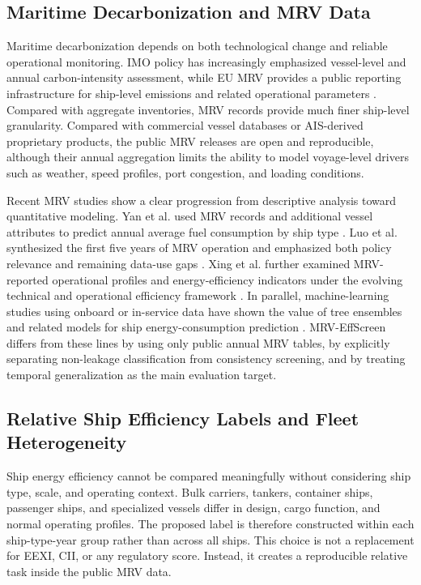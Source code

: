 \documentclass[jmse,article,submit,pdftex,oneauthor]{Definitions/mdpi}
\begin{document}
\subsection{Maritime Decarbonization and MRV Data}

Maritime decarbonization depends on both technological change and reliable operational monitoring. IMO policy has increasingly emphasized vessel-level and annual carbon-intensity assessment, while EU MRV provides a public reporting infrastructure for ship-level emissions and related operational parameters \cite{emsa_thetis_mrv,ec_2024_mrv_report,imo_2023_ghg_strategy,regulation_eu_2023_957}. Compared with aggregate inventories, MRV records provide much finer ship-level granularity. Compared with commercial vessel databases or AIS-derived proprietary products, the public MRV releases are open and reproducible, although their annual aggregation limits the ability to model voyage-level drivers such as weather, speed profiles, port congestion, and loading conditions.

Recent MRV studies show a clear progression from descriptive analysis toward quantitative modeling. Yan et al. used MRV records and additional vessel attributes to predict annual average fuel consumption by ship type \cite{yan2023mrv_energy_efficiency}. Luo et al. synthesized the first five years of MRV operation and emphasized both policy relevance and remaining data-use gaps \cite{luo2024mrv_review}. Xing et al. further examined MRV-reported operational profiles and energy-efficiency indicators under the evolving technical and operational efficiency framework \cite{xing2025mrv_efficiency_framework}. In parallel, machine-learning studies using onboard or in-service data have shown the value of tree ensembles and related models for ship energy-consumption prediction \cite{fan2024ship_energy_ml}. MRV-EffScreen differs from these lines by using only public annual MRV tables, by explicitly separating non-leakage classification from consistency screening, and by treating temporal generalization as the main evaluation target.

\subsection{Relative Ship Efficiency Labels and Fleet Heterogeneity}

Ship energy efficiency cannot be compared meaningfully without considering ship type, scale, and operating context. Bulk carriers, tankers, container ships, passenger ships, and specialized vessels differ in design, cargo function, and normal operating profiles. The proposed label is therefore constructed within each ship-type-year group rather than across all ships. This choice is not a replacement for EEXI, CII, or any regulatory score. Instead, it creates a reproducible relative task inside the public MRV data.
\end{document}
